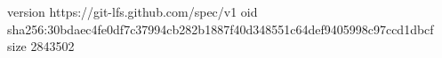 version https://git-lfs.github.com/spec/v1
oid sha256:30bdaec4fe0df7c37994cb282b1887f40d348551c64def9405998c97ccd1dbcf
size 2843502
